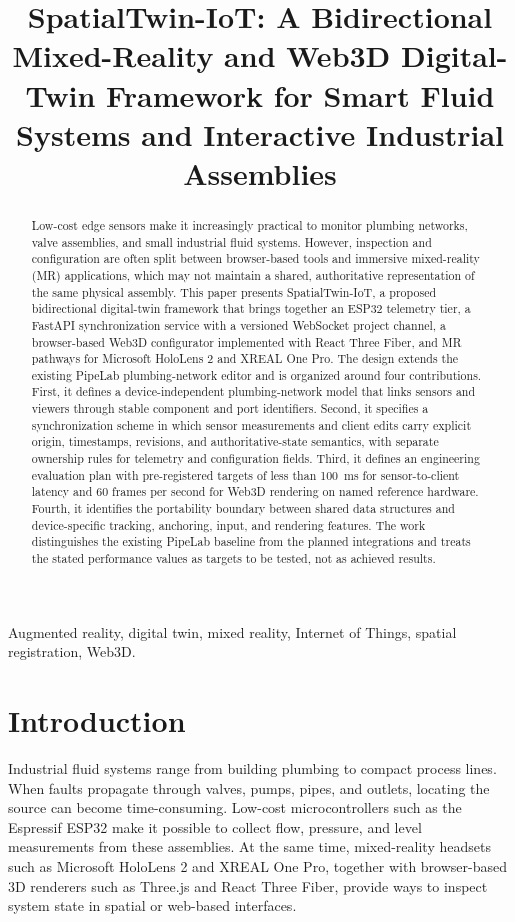 \documentclass[conference]{IEEEtran}
\title{SpatialTwin-IoT: A Bidirectional Mixed-Reality and Web3D Digital-Twin Framework for Smart Fluid Systems and Interactive Industrial Assemblies}
\author{\IEEEauthorblockN{Gopal Krishna J S, M Aaryamann Prabhu, Dr. Andhe Dharani}
\IEEEauthorblockA{Department of Master of Computer Applications\\
RV College of Engineering\textsuperscript{\textregistered}, Bengaluru, India}}
\begin{document}
\maketitle

\begin{abstract}
Low-cost edge sensors make it increasingly practical to monitor plumbing networks, valve assemblies, and small industrial fluid systems. However, inspection and configuration are often split between browser-based tools and immersive mixed-reality (MR) applications, which may not maintain a shared, authoritative representation of the same physical assembly. This paper presents SpatialTwin-IoT, a proposed bidirectional digital-twin framework that brings together an ESP32 telemetry tier, a FastAPI synchronization service with a versioned WebSocket project channel, a browser-based Web3D configurator implemented with React Three Fiber, and MR pathways for Microsoft HoloLens 2 and XREAL One Pro. The design extends the existing PipeLab plumbing-network editor and is organized around four contributions. First, it defines a device-independent plumbing-network model that links sensors and viewers through stable component and port identifiers. Second, it specifies a synchronization scheme in which sensor measurements and client edits carry explicit origin, timestamps, revisions, and authoritative-state semantics, with separate ownership rules for telemetry and configuration fields. Third, it defines an engineering evaluation plan with pre-registered targets of less than 100~ms for sensor-to-client latency and 60 frames per second for Web3D rendering on named reference hardware. Fourth, it identifies the portability boundary between shared data structures and device-specific tracking, anchoring, input, and rendering features. The work distinguishes the existing PipeLab baseline from the planned integrations and treats the stated performance values as targets to be tested, not as achieved results.
\end{abstract}

\begin{IEEEkeywords}
Augmented reality, digital twin, mixed reality, Internet of Things, spatial registration, Web3D.
\end{IEEEkeywords}

\section{Introduction}
Industrial fluid systems range from building plumbing to compact process lines. When faults propagate through valves, pumps, pipes, and outlets, locating the source can become time-consuming. Low-cost microcontrollers such as the Espressif ESP32 make it possible to collect flow, pressure, and level measurements from these assemblies. At the same time, mixed-reality headsets such as Microsoft HoloLens 2 and XREAL One Pro, together with browser-based 3D renderers such as Three.js and React Three Fiber, provide ways to inspect system state in spatial or web-based interfaces.
\end{document}

